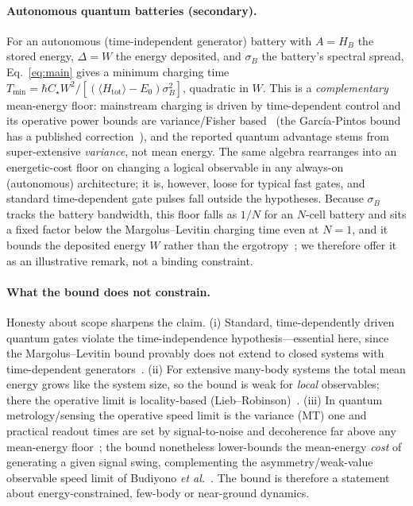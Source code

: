 \documentclass[aps,pra,twocolumn,superscriptaddress,nofootinbib,longbibliography]{revtex4-2}
\newcommand{\Ctrue}{C_{\star}}
\newcommand{\mean}[1]{\langle #1 \rangle}
\begin{document}
\paragraph{Autonomous quantum batteries (secondary).}
For an autonomous (time-independent generator) battery with $A=H_B$ the stored energy, $\Delta=W$ the energy
deposited, and $\sigma_B$ the battery's spectral spread, Eq.~\eqref{eq:main} gives a minimum charging time
$T_{\min}=\hbar\Ctrue W^2/[(\mean{H_{\mathrm{tot}}}-E_0)\sigma_B^2]$, quadratic in $W$. This is a
\emph{complementary} mean-energy floor: mainstream charging is driven by time-dependent control and its
operative power bounds are variance/Fisher
based~\cite{GarciaPintos2020BatteryPower,JuliaFarre2020Battery,Campaioli2024Colloquium} (the García-Pintos
bound has a published correction~\cite{Cusumano2021Comment}), and the reported quantum advantage stems from
super-extensive \emph{variance}, not mean energy. The same algebra rearranges into an energetic-cost floor on
changing a logical observable in any always-on (autonomous) architecture; it is, however, loose for typical
fast gates, and standard time-dependent gate pulses fall outside the hypotheses. Because $\sigma_B$ tracks the
battery bandwidth, this floor falls as $1/N$ for an $N$-cell battery and sits a fixed factor below the
Margolus--Levitin charging time even at $N=1$, and it bounds the deposited energy $W$ rather than the
ergotropy~\cite{Shrimali2024StrongerSpeedLimit}; we therefore offer it as an illustrative remark, not a
binding constraint.

\paragraph{What the bound does not constrain.}
Honesty about scope sharpens the claim. (i) Standard, time-dependently driven quantum gates violate the
time-independence hypothesis---essential here, since the Margolus--Levitin bound provably does not extend to
closed systems with time-dependent generators~\cite{Hornedal2023ClosedSystems,Hornedal2023MargolusLevitinArbitraryFidelity}. (ii) For extensive many-body systems the total mean energy grows like the
system size, so the bound is weak for \emph{local} observables; there the operative limit is locality-based
(Lieb--Robinson)~\cite{Chen2023LocalitySpeedLimits}. (iii) In quantum metrology/sensing the operative speed
limit is the variance (MT) one and practical readout times are set by signal-to-noise and decoherence far
above any mean-energy floor~\cite{HerbDegen2024Sensing}; the bound nonetheless lower-bounds the mean-energy
\emph{cost} of generating a given signal swing, complementing the asymmetry/weak-value observable speed limit
of Budiyono \emph{et al.}~\cite{Budiyono2026QSLObservables}. The bound is therefore a statement about
energy-constrained, few-body or near-ground dynamics.
\end{document}
